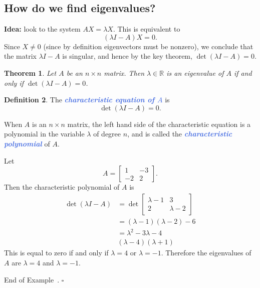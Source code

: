 \documentclass[10pt]{article}
\newcommand{\demph}[1]{\textcolor{RoyalBlue}{\textbf{\slshape #1}}} %
\newtheorem{theorem}{Theorem}
\theoremstyle{definition}
\newtheorem{definition}[theorem]{Definition}
\newtheorem{example}[theorem]{Example}
\renewenvironment{example}
{\begin{oldexample}}
  {\par\smallskip\hfill   End of Example~\theexample. $\square$    \par\end{oldexample}}
\newcommand{\R}{\mathbb{R}}           %
\begin{document}
\subsection{How do we find eigenvalues?}

\textbf{Idea:} look to the system
$AX =\lambda X$.
This is equivalent to 
\begin{equation*}
  (\lambda I-A)X=0.
\end{equation*}
Since $X\neq 0$ (since by definition eigenvectors must be nonzero), we
conclude that the matrix $\lambda I - A$ is singular, and hence by the key
theorem, $\det(\lambda I -A)=0$. 

\begin{theorem}
  Let $A$ be an $n\times n$ matrix. Then $\lambda\in \R$ is an eigenvalue of
  $A$ if and only if $\det(\lambda I-A)=0$.
\end{theorem}


\begin{definition}
  The \demph{characteristic equation of $A$ } is
  \begin{equation*}
    \det(\lambda I-A)=0.
  \end{equation*}
\end{definition}
When $A$ is an $n\times n$ matrix, the left hand side of the characteristic
equation is a polynomial in the variable $\lambda$ of degree $n$, and is
called the \demph{characteristic polynomial} of $A$.


\begin{example}
  Let
  \begin{equation*}
    A =
    \begin{bmatrix}
      1&-3\\-2&2
    \end{bmatrix}.
  \end{equation*}
  Then the characteristic polynomial of $A$ is
  \begin{align*}
    \det(\lambda I-A) 
    &= \det
      \begin{bmatrix}
        \lambda-1& 3\\
        2& \lambda-2
      \end{bmatrix} \\
    &=(\lambda-1)(\lambda-2)-6\\
    &=\lambda^{2}-3\lambda-4\\
    &(\lambda-4)(\lambda+1)
  \end{align*}
  This is equal to zero if and only if $\lambda=4$ or $\lambda=-1$. Therefore
  the eigenvalues of $A$ are $\lambda=4$ and $\lambda=-1.$ 
\end{example}
\end{document}
